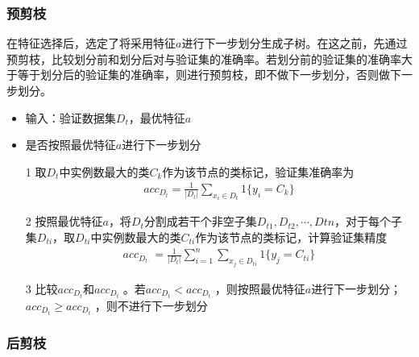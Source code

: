 \subsubsection{预剪枝}
在特征选择后，选定了将采用特征$a$进行下一步划分生成子树。在这之前，先通过预剪枝，比较划分前和划分后对与验证集的准确率。若划分前的验证集的准确率大于等于划分后的验证集的准确率，则进行预剪枝，即不做下一步划分，否则做下一步划分。
\begin{itemize}
\item 输入：验证数据集$D_t$，最优特征$a$
\item 是否按照最优特征$a$进行下一步划分
\item[1] 取$D_t$中实例数最大的类$C_k$作为该节点的类标记，验证集准确率为
\begin{eqnarray}
acc_{D_t}=\frac{1}{|D_t|}\sum_{x_i\in D_t}1\{y_i=C_k\}
\end{eqnarray}
\item[2] 按照最优特征$a$，将$D_t$分割成若干个非空子集$D_{t1},D_{t2},\cdots,D{tn}$，对于每个子集$D_{ti}$，取$D_{ti}$中实例数最大的类$C_{ti}$作为该节点的类标记，计算验证集精度
\begin{eqnarray}
acc_{D_{t\cdot}}=\frac{1}{|D_t|}\sum_{i=1}^n\sum_{x_j\in D_{ti}}1\{ y_j=C_{ti} \}
\end{eqnarray}
\item[3] 比较$acc_{D_t}$和$acc_{D_{t\cdot}}$。若$acc_{D_t}<acc_{D_{t\cdot}}$，则按照最优特征$a$进行下一步划分；$acc_{D_t}\geq acc_{D_{t\cdot}}$，则不进行下一步划分
\end{itemize}
\subsubsection{后剪枝}
